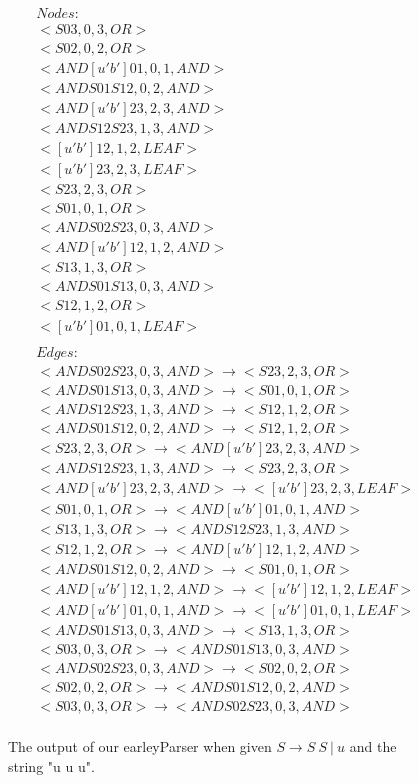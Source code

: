 \documentclass{sigplanconf}
\begin{document}
\begin{figure}
\begin{center}
\begin{align*}
&Nodes: \\
&<S03,0,3,OR> \\
&<S02,0,2,OR> \\
&<AND[u'b']01,0,1,AND> \\
&<ANDS01S12,0,2,AND> \\
&<AND[u'b']23,2,3,AND> \\
&<ANDS12S23,1,3,AND> \\
&<[u'b']12,1,2,LEAF> \\
&<[u'b']23,2,3,LEAF> \\
&<S23,2,3,OR> \\
&<S01,0,1,OR> \\
&<ANDS02S23,0,3,AND> \\
&<AND[u'b']12,1,2,AND> \\
&<S13,1,3,OR> \\
&<ANDS01S13,0,3,AND> \\
&<S12,1,2,OR> \\
&<[u'b']01,0,1,LEAF> \\
\\
&Edges: \\
&<ANDS02S23,0,3,AND>\longrightarrow<S23,2,3,OR> \\
&<ANDS01S13,0,3,AND>\longrightarrow<S01,0,1,OR> \\
&<ANDS12S23,1,3,AND>\longrightarrow<S12,1,2,OR> \\
&<ANDS01S12,0,2,AND>\longrightarrow<S12,1,2,OR> \\
&<S23,2,3,OR>\longrightarrow<AND[u'b']23,2,3,AND> \\
&<ANDS12S23,1,3,AND>\longrightarrow<S23,2,3,OR> \\
&<AND[u'b']23,2,3,AND>\longrightarrow<[u'b']23,2,3,LEAF> \\
&<S01,0,1,OR>\longrightarrow<AND[u'b']01,0,1,AND> \\
&<S13,1,3,OR>\longrightarrow<ANDS12S23,1,3,AND> \\
&<S12,1,2,OR>\longrightarrow<AND[u'b']12,1,2,AND> \\
&<ANDS01S12,0,2,AND>\longrightarrow<S01,0,1,OR> \\
&<AND[u'b']12,1,2,AND>\longrightarrow<[u'b']12,1,2,LEAF>  \\
&<AND[u'b']01,0,1,AND>\longrightarrow<[u'b']01,0,1,LEAF> \\
&<ANDS01S13,0,3,AND>\longrightarrow<S13,1,3,OR> \\
&<S03,0,3,OR>\longrightarrow<ANDS01S13,0,3,AND> \\
&<ANDS02S23,0,3,AND>\longrightarrow<S02,0,2,OR> \\
&<S02,0,2,OR>\longrightarrow<ANDS01S12,0,2,AND> \\
&<S03,0,3,OR>\longrightarrow<ANDS02S23,0,3,AND> \\
\end{align*}
\caption{The output of our earleyParser when given $S\longrightarrow{S\:{S\:{|\:{u}}}}$ and the string "u u u".} \label{fig:M6}
\end{center}
\end{figure}
\end{document}
